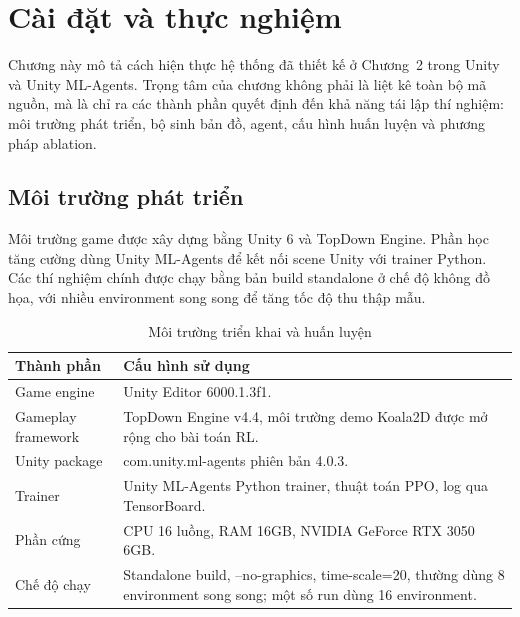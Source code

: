 \clearpage
{}

\setcounter{chapter}{2}
\chapter[Cài đặt và thực nghiệm]{Cài đặt và thực nghiệm}

Chương này mô tả cách hiện thực hệ thống đã thiết kế ở Chương~2 trong Unity và Unity ML-Agents. Trọng tâm của chương không phải là liệt kê toàn bộ mã nguồn, mà là chỉ ra các thành phần quyết định đến khả năng tái lập thí nghiệm: môi trường phát triển, bộ sinh bản đồ, agent, cấu hình huấn luyện và phương pháp ablation.

\section{Môi trường phát triển}

Môi trường game được xây dựng bằng Unity 6 và TopDown Engine. Phần học tăng cường dùng Unity ML-Agents để kết nối scene Unity với trainer Python. Các thí nghiệm chính được chạy bằng bản build standalone ở chế độ không đồ họa, với nhiều environment song song để tăng tốc độ thu thập mẫu.

\begin{table}[H]
    \centering
    \small
    \caption{Môi trường triển khai và huấn luyện}
    \label{tab:development_environment}
    \begin{tabular}{|p{5cm}|p{8cm}|}
        \hline
        \textbf{Thành phần} & \textbf{Cấu hình sử dụng} \\
        \hline
        Game engine & Unity Editor 6000.1.3f1. \\
        \hline
        Gameplay framework & TopDown Engine v4.4, môi trường demo Koala2D được mở rộng cho bài toán RL. \\
        \hline
        Unity package & com.unity.ml-agents phiên bản 4.0.3. \\
        \hline
        Trainer & Unity ML-Agents Python trainer, thuật toán PPO, log qua TensorBoard. \\
        \hline
        Phần cứng & CPU 16 luồng, RAM 16GB, NVIDIA GeForce RTX 3050 6GB. \\
        \hline
        Chế độ chạy & Standalone build, --no-graphics, time-scale=20, thường dùng 8 environment song song; một số run dùng 16 environment. \\
        \hline
    \end{tabular}
\end{table}

